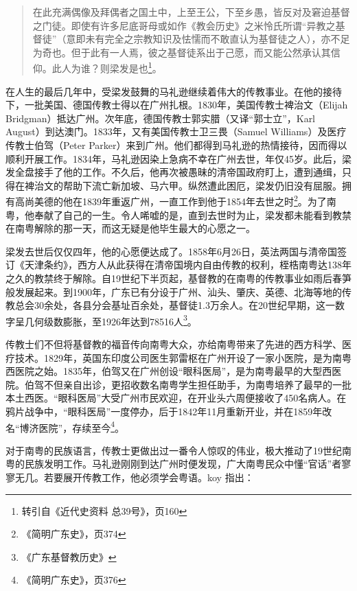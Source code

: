 \begin{quote}

在此充满偶像及拜偶者之国土中，上至王公，下至乡愚，皆反对及窘迫基督之门徒。即使有许多尼底哥母或如作《教会历史》之米怜氏所谓“异教之基督徒”（意即未有完全之宗教知识及怯懦而不敢直认为基督徒之人），亦不足为奇也。但于此有一人焉，彼之基督徒系出于己愿，而又能公然承认其信仰。此人为谁？则梁发是也\footnote{转引自《近代史资料 总39号》，页160}。

\end{quote}

在人生的最后几年中，受梁发鼓舞的马礼逊继续着伟大的传教事业。在他的接待下，一批美国、德国传教士得以在广州扎根。1830年，美国传教士裨治文（Elijah Bridgman）抵达广州。次年底，德国传教士郭实腊（又译“郭士立”，Karl August）到达澳门。1833年，又有美国传教士卫三畏（Samuel Williams）及医疗传教士伯驾（Peter Parker）来到广州。他们都得到马礼逊的热情接待，因而得以顺利开展工作。1834年，马礼逊因染上急病不幸在广州去世，年仅45岁。此后，梁发全盘接手了他的工作。不久后，他再次被愚昧的清帝国政府盯上，遭到通缉，只得在裨治文的帮助下流亡新加坡、马六甲。纵然遭此困厄，梁发仍旧没有屈服。拥有高尚美德的他在1839年重返广州，一直工作到他于1854年去世之时\footnote{《简明广东史》，页374}。为了南粤，他奉献了自己的一生。令人唏嘘的是，直到去世时为止，梁发都未能看到教禁在南粤解除的那一天，而这无疑是他毕生最大的心愿之一。

梁发去世后仅仅四年，他的心愿便达成了。1858年6月26日，英法两国与清帝国签订《天津条约》，西方人从此获得在清帝国境内自由传教的权利，桎梏南粤达138年之久的教禁终于解除。自19世纪下半页起，基督教的在南粤的传教事业如雨后春笋般发展起来。到1900年，广东已有分设于广州、汕头、肇庆、英德、北海等地的传教总会30余处，各县分会基址百余处，基督徒1.3万余人。在20世纪早期，这一数字呈几何级数膨胀，至1926年达到78516人\footnote{《广东基督教历史》}。

传教士们不但将基督教的福音传向南粤大众，亦给南粤带来了先进的西方科学、医疗技术。1829年，英国东印度公司医生郭雷枢在广州开设了一家小医院，是为南粤西医院之始。1835年，伯驾又在广州创设“眼科医局”，是为南粤最早的大型西医院。伯驾不但亲自出诊，更招收数名南粤学生担任助手，为南粤培养了最早的一批本土西医。“眼科医局”大受广州市民欢迎，在开业头六周便接收了450名病人。在鸦片战争中，“眼科医局”一度停办，后于1842年11月重新开业，并在1859年改名“博济医院”，存续至今\footnote{《简明广东史》，页376}。

对于南粤的民族语言，传教士更做出过一番令人惊叹的伟业，极大推动了19世纪南粤的民族发明工作。马礼逊刚刚到达广州时便发现，广大南粤民众中懂“官话”者寥寥无几。若要展开传教工作，他必须学会粤语。koy 指出：

